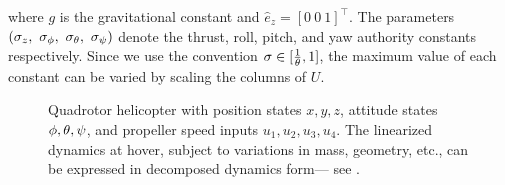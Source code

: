where $g$ is the gravitational constant
and $\hat e_z = [0\ 0\ 1]^\top$.
The parameters
$(\sigma_z,\ \sigma_\roll,\ \sigma_\pitch,\ \sigma_\yaw)$
denote
the thrust, roll, pitch, and yaw authority constants respectively.
Since we use the convention $\sigma \in [\frac{1}{\theta}, 1]$,
the maximum value of each constant can be varied
by scaling the columns of $U$.




\begin{figure}[tpb]
	\begin{minipage}{0.28\textwidth}
		
	\end{minipage}
	\hfill
	\begin{minipage}{0.68\textwidth}
		\caption{%
			Quadrotor helicopter with position states $x, y, z$,
			attitude states $\phi, \theta, \psi$,
			and propeller speed inputs $u_1, u_2, u_3, u_4$.
			The linearized dynamics at hover,
			subject to variations in mass, geometry, etc.,
			can be expressed in decomposed dynamics form---%
			see .
		}%
		\label{fig:quadrotor}
	\end{minipage}
\end{figure}

